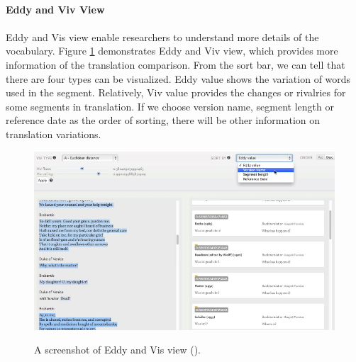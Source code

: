\paragraph{Eddy and Viv View}
\paragraph[]{}

Eddy and Vis view enable researchers to understand more details   of the vocabulary. Figure \ref{fig:eddyVivView} demonstrates Eddy and Viv view, which provides more information of the translation comparison. From the sort bar, we can tell that there are four types can be visualized. Eddy value shows the variation of words used in the segment. Relatively, Viv value provides the changes or rivalries for some segments in translation.  If we choose version name, segment length or reference date as the order of sorting, there will be other information on translation variations. 

\begin{figure}[H] 
	\centering    
	\includegraphics[scale=0.6]{Figs/Eddy-Viv-View}\\[1ex]
	\caption{A screenshot of Eddy and Vis view (\cite{Cheesman2012}).}
	\label{fig:eddyVivView}
\end{figure} 



